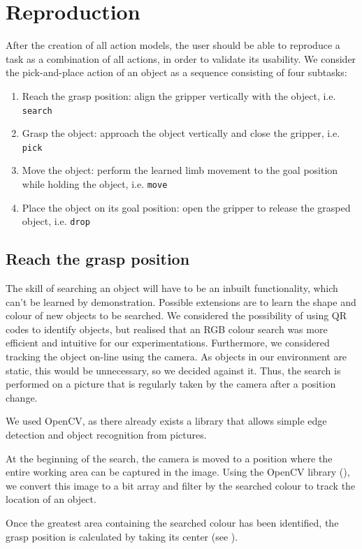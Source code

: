 \section{Reproduction}
After the creation of all action models, the user should be able to reproduce a task as a combination of all actions, in order to validate its usability.
We consider the pick-and-place action of an object as a sequence consisting of four subtasks:
\begin{enumerate}
\item Reach the grasp position: align the gripper vertically with the object, i.e.
\texttt{search}
\item Grasp the object: approach the object vertically and close the gripper, i.e.
\texttt{pick}
\item Move the object: perform the learned limb movement to the goal position while holding the object, i.e.
\texttt{move}
\item Place the object on its goal position: open the gripper to release the grasped object, i.e.
\texttt{drop}
\end{enumerate}

\subsection{Reach the grasp position}\label{Object Search}
The skill of searching an object will have to be an inbuilt functionality, which can't be learned by demonstration.
Possible extensions are to learn the shape and colour of new objects to be searched.
We considered the possibility of using QR codes to identify objects, but realised that an RGB colour search was more efficient and intuitive for our experimentations.
Furthermore, we considered tracking the object on-line using the camera.
As objects in our environment are static, this would be unnecessary, so we decided against it.
Thus, the search is performed on a picture that is regularly taken by the camera after a position change.

We used OpenCV, as there already exists a library that allows simple edge detection and object recognition from pictures.

At the beginning of the search, the camera is moved to a position where the entire working area can be captured in the image.
Using the OpenCV library (\cite{opencv}), we convert this image to a bit array and filter by the searched colour to track the location of an object.

Once the greatest area containing the searched colour has been identified, the grasp position is calculated by taking its center (see ).

